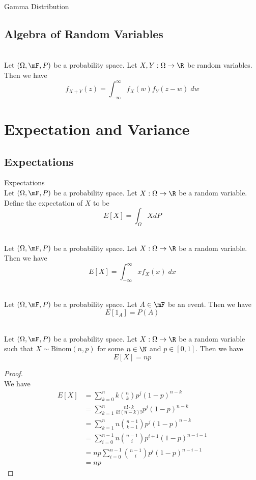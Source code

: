 \documentclass[a4paper]{article}
\begin{document}
\begin{defn}{Gamma Distribution}{}
\end{defn}

\subsection{Algebra of Random Variables}
\begin{prp}{}{}\\
Let $(\Omega,\mF,P)$ be a probability space. Let $X,Y:\Omega\to\R$ be random variables. Then we have $$f_{X+Y}(z)=\int_{-\infty}^\infty f_X(w)f_Y(z-w)\;dw$$
\end{prp}

\pagebreak
\section{Expectation and Variance}
\subsection{Expectations}
\begin{defn}{Expectations}{}\\
Let $(\Omega,\mF,P)$ be a probability space. Let $X:\Omega\to\R$ be a random variable. Define the expectation of $X$ to be $$E[X]=\int_\Omega XdP$$
\end{defn}

\begin{lmm}{}{}\\
Let $(\Omega,\mF,P)$ be a probability space. Let $X:\Omega\to\R$ be a random variable. Then we have $$E[X]=\int_{-\infty}^\infty xf_X(x)\;dx$$
\end{lmm}

\begin{lmm}{}{}\\
Let $(\Omega,\mF,P)$ be a probability space. Let $A\in\mF$ be an event. Then we have $$E[1_A]=P(A)$$
\end{lmm}

\begin{eg}{}{}\\
Let $(\Omega,\mF,P)$ be a probability space. Let $X:\Omega\to\R$ be a random variable such that $X\sim\text{Binom}(n,p)$ for some $n\in\N$ and $p\in[0,1]$. Then we have $$E[X]=np$$
\begin{proof}\\
We have
\begin{align*}
E[X]&=\sum_{k=0}^nk\binom{n}{k}p^j(1-p)^{n-k}\\
&=\sum_{k=1}^n\frac{n!\cdot k}{k!(n-k)!}p^j(1-p)^{n-k}\\
&=\sum_{k=1}^nn\binom{n-1}{k-1}p^j(1-p)^{n-k}\\
&=\sum_{i=0}^{n-1}n\binom{n-1}{i}p^{i+1}(1-p)^{n-i-1}\tag{$i=k-1$}\\
&=np\sum_{i=0}^{n-1}\binom{n-1}{i}p^i(1-p)^{n-i-1}\\
&=np
\end{align*}
\end{proof}
\end{eg}
\end{document}

